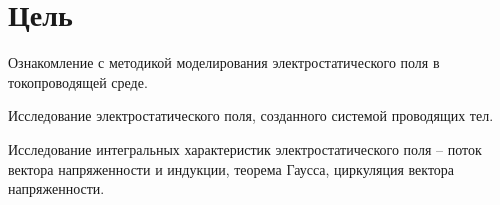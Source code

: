 \section*{Цель}

Ознакомление с методикой моделирования
электростатического поля в токопроводящей среде.

Исследование
электростатического поля, созданного
системой проводящих тел.

Исследование
интегральных характеристик
электростатического поля – поток вектора
напряженности и индукции, теорема
Гаусса, циркуляция вектора
напряженности. 